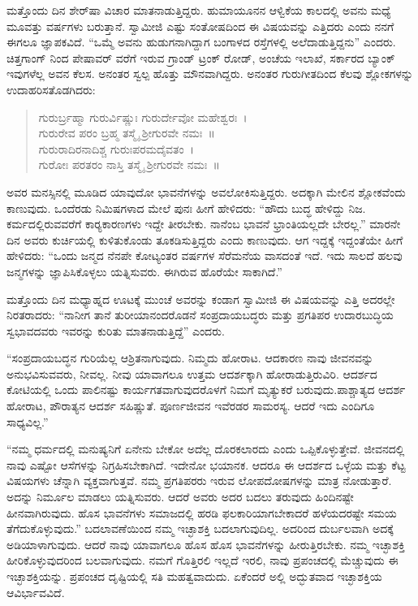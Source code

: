  ಮತ್ತೊಂದು ದಿನ ಶೇರ್‌ಷಾ ವಿಚಾರ ಮಾತನಾಡುತ್ತಿದ್ದರು. ಹುಮಾಯೂನನ ಆಳ್ವಿಕೆಯ ಕಾಲದಲ್ಲಿ ಅವನು ಮಧ್ಯೆ ಮೂವತ್ತು ವರ್ಷಗಳು ಬರುತ್ತಾನೆ. ಸ್ವಾಮೀಜಿ ಎಷ್ಟು ಸಂತೋಷದಿಂದ ಈ ವಿಷಯವನ್ನು ಎತ್ತಿದರು ಎಂದು ನನಗೆ ಈಗಲೂ ಜ್ಞಾಪಕವಿದೆ. “ಒಮ್ಮೆ ಅವನು ಹುಡುಗನಾಗಿದ್ದಾಗ ಬಂಗಾಳದ ರಸ್ತೆಗಳಲ್ಲಿ ಅಲೆದಾಡುತ್ತಿದ್ದನು” ಎಂದರು. ಚಿತ್ತಗಾಂಗ್ ನಿಂದ ಪೇಷಾವರ್ ವರೆಗೆ ಇರುವ ಗ್ರಾಂಡ್ ಟ್ರಂಕ್ ರೋಡ್, ಅಂಚೆಯ ಇಲಾಖೆ, ಸರ್ಕಾರದ ಬ್ಯಾಂಕ್ ಇವುಗಳೆಲ್ಲ ಅವನ ಕೆಲಸ. ಅನಂತರ ಸ್ವಲ್ಪ ಹೊತ್ತು ಮೌನವಾಗಿದ್ದರು. ಅನಂತರ ಗುರುಗೀತದಿಂದ ಕೆಲವು ಶ್ಲೋಕಗಳನ್ನು ಉದಾಹರಿಸತೊಡಗಿದರು:

\begin{verse}
ಗುರುರ್ಬ್ರಹ್ಮಾ ಗುರುರ್ವಿಷ್ಣುಃ ಗುರುರ್ದೇವೋ ಮಹೇಶ್ವರಃ~।\\ ಗುರುರೇವ ಪರಂ ಬ್ರಹ್ಮ ತಸ್ಮೈ ಶ‍್ರೀಗುರವೇ ನಮಃ~॥\\ ಗುರುರಾದಿರನಾದಿಶ್ಚ ಗುರುಃಪರಮದೈವತಂ~।\\ ಗುರೋಃ ಪರತರಂ ನಾಸ್ತಿ ತಸ್ಮೈ ಶ‍್ರೀಗುರವೇ ನಮಃ~॥
\end{verse}

 ಅವರ ಮನಸ್ಸಿನಲ್ಲಿ ಮೂಡಿದ ಯಾವುದೋ ಭಾವನೆಗಳನ್ನು ಅವಲೋಕಿಸುತ್ತಿದ್ದರು. ಅದಕ್ಕಾಗಿ ಮೇಲಿನ ಶ್ಲೋಕವೆಂದು ಕಾಣುವುದು. ಒಂದೆರಡು ನಿಮಿಷಗಳಾದ ಮೇಲೆ ಪುನಃ ಹೀಗೆ ಹೇಳಿದರು: “ಹೌದು ಬುದ್ಧ ಹೇಳಿದ್ದು ನಿಜ. ಕರ್ಮದಲ್ಲಿರುವವರೆಗೆ ಕಾರ‍್ಯಕಾರಣಗಳು ಇದ್ದೇ ತೀರಬೇಕು. ನಾನೆಂಬ ಭಾವನೆ ಭ್ರಾಂತಿಯಲ್ಲದೇ ಬೇರಲ್ಲ.” ಮಾರನೇ ದಿನ ಅವರು ಕುರ್ಚಿಯಲ್ಲಿ ಕುಳಿತುಕೊಂಡು ತೂಕಡಿಸುತ್ತಿದ್ದರು ಎಂದು ಕಾಣುವುದು. ಆಗ ಇದ್ದಕ್ಕೆ ಇದ್ದಂತೆಯೇ ಹೀಗೆ ಹೇಳಿದರು: “ಒಂದು ಜನ್ಮದ ನೆನಪೇ ಕೋಟ್ಯಂತರ ವರ್ಷಗಳ ಸೆರೆಮನೆಯ ವಾಸದಂತೆ ಇದೆ. ಇದು ಸಾಲದೆ ಹಲವು ಜನ್ಮಗಳನ್ನು ಜ್ಞಾಪಿಸಿಕೊಳ್ಳಲು ಯತ್ನಿಸುವರು. ಈಗಿರುವ ಹೊರೆಯೇ ಸಾಕಾಗಿದೆ.” 

 ಮತ್ತೊಂದು ದಿನ ಮಧ್ಯಾಹ್ನದ ಊಟಕ್ಕೆ ಮುಂಚೆ ಅವರನ್ನು ಕಂಡಾಗ ಸ್ವಾಮೀಜಿ ಈ ವಿಷಯವನ್ನು ಎತ್ತಿ ಅದರಲ್ಲೇ ನಿರತರಾದರು: “ನಾನೀಗ ತಾನೆ ತುರೀಯಾನಂದರೊಡನೆ ಸಂಪ್ರದಾಯಬದ್ಧರು ಮತ್ತು ಪ್ರಗತಿಪರ ಉದಾರಬುದ್ಧಿಯ ಸ್ವಭಾವದವರು ಇವರನ್ನು ಕುರಿತು ಮಾತನಾಡುತ್ತಿದ್ದೆ” ಎಂದರು. 

 “ಸಂಪ್ರದಾಯಬದ್ಧನ ಗುರಿಯೆಲ್ಲ ಆಶ್ರಿತನಾಗುವುದು. ನಿಮ್ಮದು ಹೋರಾಟ. ಆದಕಾರಣ ನಾವು ಜೀವನವನ್ನು ಅನುಭವಿಸುವವರು, ನೀವಲ್ಲ. ನೀವು ಯಾವಾಗಲೂ ಉತ್ತಮ ಆದರ್ಶಕ್ಕಾಗಿ ಹೋರಾಡುತ್ತಿರುವಿರಿ. ಆದರ್ಶದ ಕೋಟಿಯಲ್ಲಿ ಒಂದು ಪಾಲಿನಷ್ಟು ಕಾರ್ಯಗತವಾಗುವುದರೊಳಗೆ ನಿಮಗೆ ಮೃತ್ಯುಕರೆ ಬರುವುದು.\break ಪಾಶ್ಚಾತ್ಯದ ಆದರ್ಶ ಹೋರಾಟ, ಪೌರಾತ್ಯನ ಆದರ್ಶ ಸಹಿಷ್ಣುತೆ. ಪೂರ್ಣಜೀವನ ಇವೆರಡರ ಸಾಮರಸ್ಯ. ಆದರೆ ಇದು ಎಂದಿಗೂ ಸಾಧ್ಯವಿಲ್ಲ.” 

 “ನಮ್ಮ ಧರ್ಮದಲ್ಲಿ ಮನುಷ್ಯನಿಗೆ ಏನೇನು ಬೇಕೋ ಅದೆಲ್ಲ ದೊರಕಲಾರದು ಎಂದು ಒಪ್ಪಿಕೊಳ್ಳುತ್ತೇವೆ. ಜೀವನದಲ್ಲಿ ನಾವು ಎಷ್ಟೋ ಆಸೆಗಳನ್ನು ನಿಗ್ರಹಿಸಬೇಕಾಗಿದೆ. ಇದೇನೋ ಭಯಾನಕ. ಆದರೂ ಈ ಆದರ್ಶದ ಒಳ್ಳೆಯ ಮತ್ತು ಕೆಟ್ಟ ವಿಷಯಗಳು ಚೆನ್ನಾಗಿ ವ್ಯಕ್ತವಾಗುತ್ತವೆ. ನಮ್ಮ ಪ್ರಗತಿಪರರು ಇರುವ ಲೋಪದೋಷಗಳನ್ನು ಮಾತ್ರ ನೋಡುತ್ತಾರೆ. ಅದನ್ನು ನಿರ್ಮೂಲ ಮಾಡಲು ಯತ್ನಿಸುವರು. ಆದರೆ ಅವರು ಅದರ ಬದಲು ತರುವುದು ಹಿಂದಿನಷ್ಟೇ ಹೀನವಾಗಿರುವುದು. ಹೊಸ ಭಾವನೆಗಳು ಸಮಾಜದಲ್ಲಿ ಹರಡಿ ಫಲಕಾರಿಯಾಗಬೇಕಾದರೆ ಹಳೆಯದರಷ್ಟೇ ಸಮಯ ತೆಗೆದುಕೊಳ್ಳುವುದು.” ಬದಲಾವಣೆಯಿಂದ ನಮ್ಮ ಇಚ್ಛಾಶಕ್ತಿ ಬದಲಾಗುವುದಿಲ್ಲ. ಅದರಿಂದ ದುರ್ಬಲವಾಗಿ ಅದಕ್ಕೆ ಅಡಿಯಾಳಾಗುವುದು. ಆದರೆ ನಾವು ಯಾವಾಗಲೂ ಹೊಸ ಹೊಸ ಭಾವನೆಗಳನ್ನು ಹೀರುತ್ತಿರಬೇಕು. ನಮ್ಮ ಇಚ್ಛಾಶಕ್ತಿ ಹೀರಿಕೊಳ್ಳುವುದರಿಂದ ಬಲವಾಗುವುದು. ನಮಗೆ ಗೊತ್ತಿರಲಿ ಇಲ್ಲದೆ ಇರಲಿ, ನಾವು ಪ್ರಪಂಚದಲ್ಲಿ ಮೆಚ್ಚುವುದು ಈ ಇಚ್ಛಾಶಕ್ತಿಯನ್ನು. ಪ್ರಪಂಚದ ದೃಷ್ಟಿಯಲ್ಲಿ ಸತಿ ಮಹತ್ವವಾದುದು. ಏಕೆಂದರೆ ಅಲ್ಲಿ ಅದ್ಭುತವಾದ ಇಚ್ಛಾಶಕ್ತಿಯ ಆವಿರ್ಭಾವವಿದೆ. 

